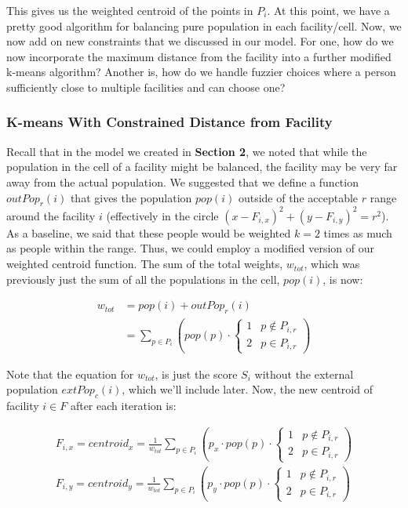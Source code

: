 \documentclass{article}
\begin{document}
This gives us the weighted centroid of the points in $P_i$. At this point, we have a pretty good algorithm for balancing pure population in each facility/cell. Now, we now add on new constraints that we discussed in our model. For one, how do we now incorporate the maximum distance from the facility into a further modified k-means algorithm? Another is, how do we handle fuzzier choices where a person sufficiently close to multiple facilities and can choose one?

\subsubsection*{K-means With Constrained Distance from Facility}

Recall that in the model we created in \textbf{Section 2}, we noted that while the population in the cell of a facility might be balanced, the facility may be very far away from the actual population. We suggested that we define a function $outPop_r(i)$ that gives the population $pop(i)$ outside of the acceptable $r$ range around the facility $i$ (effectively in the circle $(x-F_{i, x})^2 + (y-F_{i, y})^2 = r^2$). As a baseline, we said that these people would be weighted $k = 2$ times as much as people within the range. Thus, we could employ a modified version of our weighted centroid function. The sum of the total weights, $w_{tot}$, which was previously just the sum of all the populations in the cell, $pop(i)$, is now:

\begin{align*}
    w_{tot} &= pop(i) + outPop_r(i) \\
            &= \sum_{p \in P_i} \left( pop(p) \cdot \begin{cases}
                 1 & p \notin P_{i, r} \\
                 2 & p \in P_{i, r} 
                \end{cases}
            \right)
\end{align*}

Note that the equation for $w_{tot}$, is just the score $S_i$ without the external population $extPop_c(i)$, which we'll include later. Now, the new centroid of facility $i \in F$ after each iteration is:

\begin{gather}
F_{i, x} = centroid_x = \frac{1}{w_{tot}} \sum_{p \in P_i} \left( p_x \cdot pop(p) \cdot \begin{cases}
                 1 & p \notin P_{i, r} \\
                 2 & p \in P_{i, r}
                \end{cases} \right) \\
F_{i, y} = centroid_y = \frac{1}{w_{tot}} \sum_{p \in P_i} \left( p_y \cdot pop(p) \cdot \begin{cases}
                 1 & p \notin P_{i, r} \\
                 2 & p \in P_{i, r}
                \end{cases} \right)
\end{gather}
\end{document}
